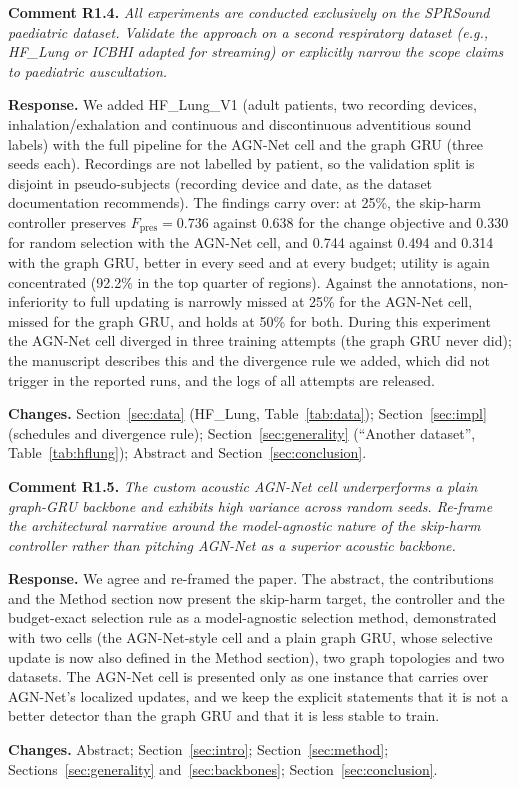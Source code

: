 \documentclass[11pt]{article}
\newcommand{\rc}[2]{\par\medskip\noindent\colorbox{black!6}{\parbox{\dimexpr\linewidth-2\fboxsep}{\textbf{Comment #1.} \itshape #2}}\par}
\newcommand{\resp}{\par\noindent\textbf{Response.} }
\newcommand{\chg}{\par\noindent\textbf{Changes.} }
\begin{document}
\rc{R1.4}{All experiments are conducted exclusively on the SPRSound paediatric dataset. Validate the approach on a second respiratory dataset (e.g., HF\_Lung or ICBHI adapted for streaming) or explicitly narrow the scope claims to paediatric auscultation.}
\resp We added HF\_Lung\_V1 (adult patients, two recording devices, inhalation/exhalation and continuous and discontinuous adventitious sound labels) with the full pipeline for the AGN-Net cell and the graph GRU (three seeds each). Recordings are not labelled by patient, so the validation split is disjoint in pseudo-subjects (recording device and date, as the dataset documentation recommends). The findings carry over: at 25\%, the skip-harm controller preserves $F_{\mathrm{pres}}=0.736$ against 0.638 for the change objective and 0.330 for random selection with the AGN-Net cell, and 0.744 against 0.494 and 0.314 with the graph GRU, better in every seed and at every budget; utility is again concentrated (92.2\% in the top quarter of regions). Against the annotations, non-inferiority to full updating is narrowly missed at 25\% for the AGN-Net cell, missed for the graph GRU, and holds at 50\% for both. During this experiment the AGN-Net cell diverged in three training attempts (the graph GRU never did); the manuscript describes this and the divergence rule we added, which did not trigger in the reported runs, and the logs of all attempts are released.
\chg Section~\ref{sec:data} (HF\_Lung, Table~\ref{tab:data}); Section~\ref{sec:impl} (schedules and divergence rule); Section~\ref{sec:generality} (``Another dataset'', Table~\ref{tab:hflung}); Abstract and Section~\ref{sec:conclusion}.

\rc{R1.5}{The custom acoustic AGN-Net cell underperforms a plain graph-GRU backbone and exhibits high variance across random seeds. Re-frame the architectural narrative around the model-agnostic nature of the skip-harm controller rather than pitching AGN-Net as a superior acoustic backbone.}
\resp We agree and re-framed the paper. The abstract, the contributions and the Method section now present the skip-harm target, the controller and the budget-exact selection rule as a model-agnostic selection method, demonstrated with two cells (the AGN-Net-style cell and a plain graph GRU, whose selective update is now also defined in the Method section), two graph topologies and two datasets. The AGN-Net cell is presented only as one instance that carries over AGN-Net's localized updates, and we keep the explicit statements that it is not a better detector than the graph GRU and that it is less stable to train.
\chg Abstract; Section~\ref{sec:intro}; Section~\ref{sec:method}; Sections~\ref{sec:generality} and~\ref{sec:backbones}; Section~\ref{sec:conclusion}.
\end{document}
